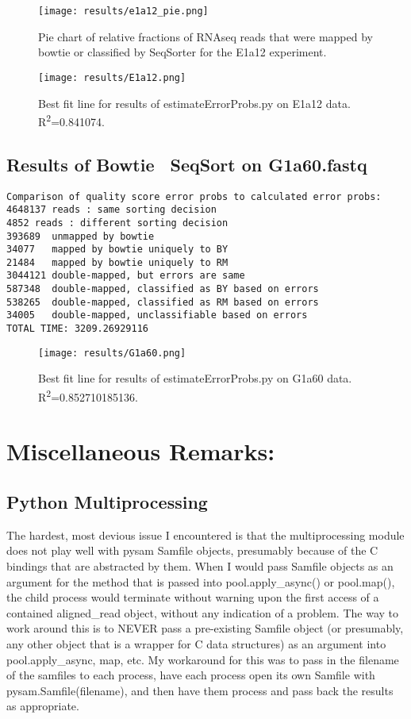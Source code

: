 \documentclass[11pt]{article}
\begin{document}
\begin{figure}[!htpb]
\centering
\texttt{[image: results/e1a12\_pie.png]}
\caption{Pie chart of relative fractions of RNAseq reads that were mapped by bowtie or classified by SeqSorter for the E1a12 experiment.}
\label{fig:e1a12_pie}
\end{figure}
\pagebreak

\begin{figure}[!htpb]
\centering
\texttt{[image: results/E1a12.png]}
\caption{Best fit line for results of estimateErrorProbs.py on E1a12 data. R\textsuperscript{2}=0.841074.}
\label{fig:e1a12}
\end{figure}

\subsection*{Results of Bowtie \textbar \ SeqSort on G1a60.fastq}
\begin{verbatim}
Comparison of quality score error probs to calculated error probs:
4648137 reads : same sorting decision
4852 reads : different sorting decision
393689	unmapped by bowtie
34077	mapped by bowtie uniquely to BY
21484	mapped by bowtie uniquely to RM
3044121	double-mapped, but errors are same
587348	double-mapped, classified as BY based on errors
538265	double-mapped, classified as RM based on errors
34005	double-mapped, unclassifiable based on errors
TOTAL TIME: 3209.26929116
\end{verbatim}

\begin{figure}[!htpb]
\centering
\texttt{[image: results/G1a60.png]}
\caption{Best fit line for results of estimateErrorProbs.py on G1a60 data. R\textsuperscript{2}=0.852710185136.}
\label{fig:g1a60}
\end{figure}



\pagebreak
\section*{Miscellaneous Remarks:}
\subsection*{Python Multiprocessing}
The hardest, most devious issue I encountered is that the multiprocessing module does not play well with pysam Samfile objects, presumably because of the C bindings that are abstracted by them. When I would pass Samfile objects as an argument for the method that is passed into pool.apply\_async() or pool.map(), the child process would terminate without warning upon the first access of a contained aligned\_read object, without any indication of a problem. The way to work around this is to NEVER pass a pre-existing Samfile object (or presumably, any other object that is a wrapper for C data structures) as an argument into pool.apply\_async, map, etc. My workaround for this was to pass in the filename of the samfiles to each process, have each process open its own Samfile with pysam.Samfile(filename), and then have them process and pass back the results as appropriate.
\end{document}
